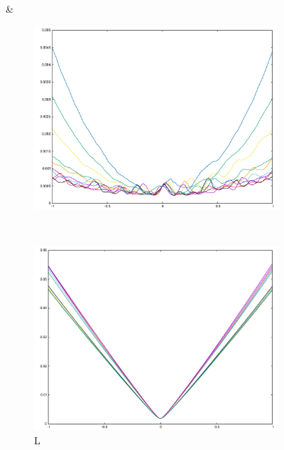 \begin{figure}[H]
\begin{subfigure}{.33\textwidth}
\end{subfigure}&
\begin{subfigure}{.33\textwidth}
	\includegraphics[width=\linewidth]{fig/ajherr/t/S_chi.pdf}
\end{subfigure}\\
\begin{subfigure}{.33\textwidth}
	\includegraphics[width=\linewidth]{fig/ajherr/t/L_mae.pdf}
	\caption{L}
\end{subfigure}%
\begin{subfigure}{.33\textwidth}

\end{subfigure}
\end{figure}
